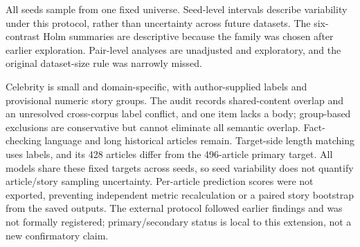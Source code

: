 All seeds sample from one fixed universe. Seed-level intervals describe variability under this protocol, rather than uncertainty across future datasets. The six-contrast Holm summaries are descriptive because the family was chosen after earlier exploration. Pair-level analyses are unadjusted and exploratory, and the original dataset-size rule was narrowly missed.

Celebrity is small and domain-specific, with author-supplied labels and provisional numeric story groups. The audit records shared-content overlap and an unresolved cross-corpus label conflict, and one item lacks a body; group-based exclusions are conservative but cannot eliminate all semantic overlap. Fact-checking language and long historical articles remain. Target-side length matching uses labels, and its 428 articles differ from the 496-article primary target. All models share these fixed targets across seeds, so seed variability does not quantify article/story sampling uncertainty. Per-article prediction scores were not exported, preventing independent metric recalculation or a paired story bootstrap from the saved outputs. The external protocol followed earlier findings and was not formally registered; primary/secondary status is local to this extension, not a new confirmatory claim.

